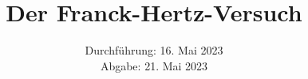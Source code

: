 

\subject{\texorpdfstring{\vspace{2ex}}{}V601\texorpdfstring{\vspace{-2ex}}{}} %
\title{Der Franck-Hertz-Versuch} %
\date{
	Durchführung: 16. Mai 2023 %
	\\ Abgabe: 21. Mai 2023 %
}




\maketitle
\thispagestyle{empty}


\tableofcontents
\newpage







\printbibliography{}

\newpage



